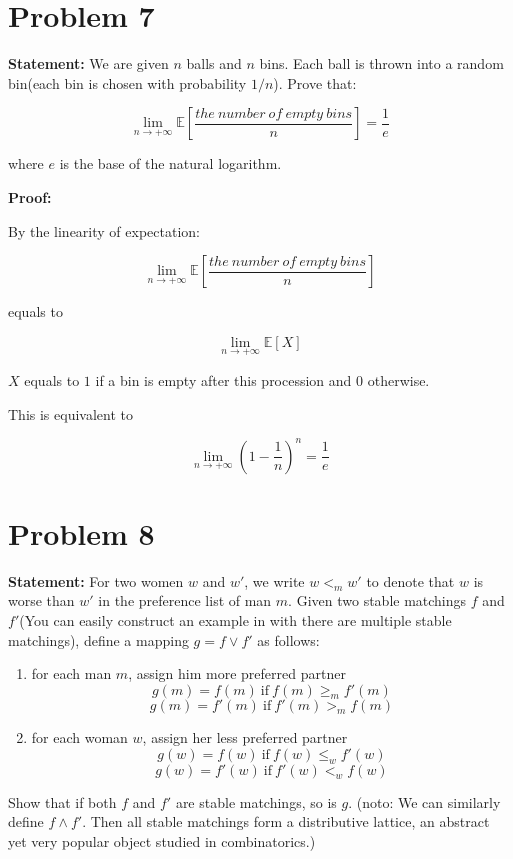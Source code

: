 \documentclass[12 pt]{article}
\begin{document}
\section{Problem 7}

\textbf{Statement: } We are given $n$ balls and $n$ bins. Each ball is thrown into a random bin(each bin is chosen with probability $1/n$). Prove that:

$$
\lim_{n\to +\infty}\mathbb{E}\left[\frac{the\ number\ of\ empty\ bins}{n}\right] = \frac{1}{e}
$$

where $e$ is the base of the natural logarithm.

\textbf{Proof: }

By the linearity of expectation:

$$
\lim_{n\to +\infty}\mathbb{E}\left[\frac{the\ number\ of\ empty\ bins}{n}\right]
$$

equals to

$$
\lim_{n\to +\infty}\mathbb{E}\left[X\right]
$$

$X$ equals to $1$ if a bin is empty after this procession and $0$ otherwise.

This is equivalent to

$$
\lim_{n\to +\infty}(1 - \frac{1}{n})^n = \frac{1}{e}
$$

\section{Problem 8}

\textbf{Statement: } For two women $w$ and $w'$, we write $w <_m w'$ to denote that $w$ is worse than $w'$ in the preference list of man $m$. Given two stable matchings $f$ and $f'$(You can easily construct an example in with there are multiple stable matchings), define a mapping $g = f\vee f'$ as follows:

\begin{enumerate}
  \item for each man $m$, assign him more preferred partner
  $$
  g(m) = f(m)\ \text{if}\ f(m) \ge_m f'(m)
  $$
  $$
  g(m) = f'(m)\ \text{if}\ f'(m) >_m f(m)
  $$
  \item for each woman $w$, assign her less preferred partner
  $$
  g(w) = f(w)\ \text{if}\ f(w)\le_w f'(w)
  $$
  $$
  g(w) = f'(w)\ \text{if}\ f'(w)<_w f(w)
  $$
\end{enumerate}

Show that if both $f$ and $f'$ are stable matchings, so is $g$. (noto: We can similarly define $f\wedge f'$. Then all stable matchings form a distributive lattice, an abstract yet very popular object studied in combinatorics.)
\end{document}
